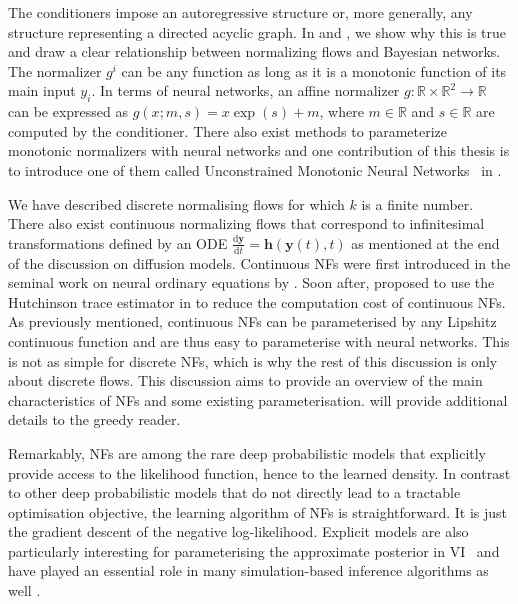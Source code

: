 The conditioners impose an autoregressive structure or, more generally, any structure representing a directed acyclic graph. In  and , we show why this is true and draw a clear relationship between normalizing flows and Bayesian networks. The normalizer $g^i$ can be any function as long as it is a monotonic function of its main input $y_i$. In terms of neural networks, an affine normalizer $g: \mathbb{R} \times \mathbb{R}^2 \rightarrow \mathbb{R}$ can be expressed as
$g(x;m, s) = x\exp(s) + m$, where $m \in \mathbb{R}$ and $s \in \mathbb{R}$ are computed by the conditioner. There also exist methods to parameterize monotonic normalizers \citep{huang_neural_2018, de_cao_block_2020, durkan_neural_2019, jaini_sum--squares_2019} with neural networks and one contribution of this thesis is to introduce one of them called Unconstrained Monotonic Neural Networks~\citep[UMNNs, ][]{wehenkel_unconstrained_2019} in .

We have described discrete normalising flows for which $k$ is a finite number. There also exist continuous normalizing flows that correspond to infinitesimal transformations defined by an ODE $\frac{\text{d} \bm{y} }{\text{d}t} = \bm{h}(\bm{y}(t), t)$ as mentioned at the end of the discussion on diffusion models. Continuous NFs were first introduced in the seminal work on neural ordinary equations by \citet[NODE,][]{chen_neural_2018}. Soon after, \citet{grathwohl_ffjord_2018} proposed to use the Hutchinson trace estimator in  to reduce the computation cost of continuous NFs. As previously mentioned, continuous NFs can be parameterised by any Lipshitz continuous function and are thus easy to parameterise with neural networks. This is not as simple for discrete NFs, which is why the rest of this discussion is only about discrete flows. This discussion aims to provide an overview of the main characteristics of NFs and some existing parameterisation. \citet{papamakarios_normalizing_2019, kobyzev_normalizing_2020} will provide additional details to the greedy reader.

Remarkably, NFs are among the rare deep probabilistic models that explicitly provide access to the likelihood function, hence to the learned density. In contrast to other deep probabilistic models that do not directly lead to a tractable optimisation objective, the learning algorithm of NFs is straightforward. It is just the gradient descent of the negative log-likelihood. Explicit models are also particularly interesting for parameterising the approximate posterior in VI~\citep{rezende2015variational} and have played an essential role in many simulation-based inference algorithms as well \citep{papamakarios_sequential_2019, greenberg_automatic_2019}.

